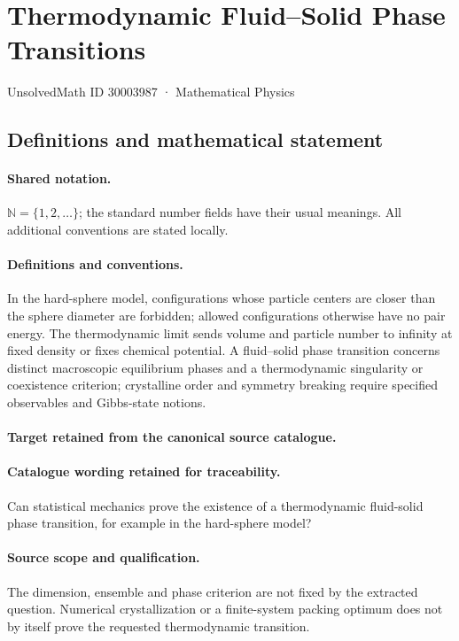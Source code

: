 \documentclass[11pt]{article}
\begin{document}
\setcounter{section}{30003986}
\section{Thermodynamic Fluid–Solid Phase Transitions}\label{30003987}
{\small UnsolvedMath ID 30003987 · Mathematical Physics}
\subsection{Definitions and mathematical statement}

\paragraph{Shared notation.}$\mathbb N=\{1,2,\ldots\}$; the standard number fields have their usual meanings. All additional conventions are stated locally.


\paragraph{Definitions and conventions.}
In the hard-sphere model, configurations whose particle centers are closer than the sphere diameter are forbidden; allowed configurations otherwise have no pair energy. The thermodynamic limit sends volume and particle number to infinity at fixed density or fixes chemical potential. A fluid--solid phase transition concerns distinct macroscopic equilibrium phases and a thermodynamic singularity or coexistence criterion; crystalline order and symmetry breaking require specified observables and Gibbs-state notions.

\paragraph{Target retained from the canonical source catalogue.}
\paragraph{Catalogue wording retained for traceability.}
Can statistical mechanics prove the existence of a thermodynamic fluid-solid phase transition, for example in the hard-sphere model?

\paragraph{Source scope and qualification.}
The dimension, ensemble and phase criterion are not fixed by the extracted question. Numerical crystallization or a finite-system packing optimum does not by itself prove the requested thermodynamic transition.
\end{document}
